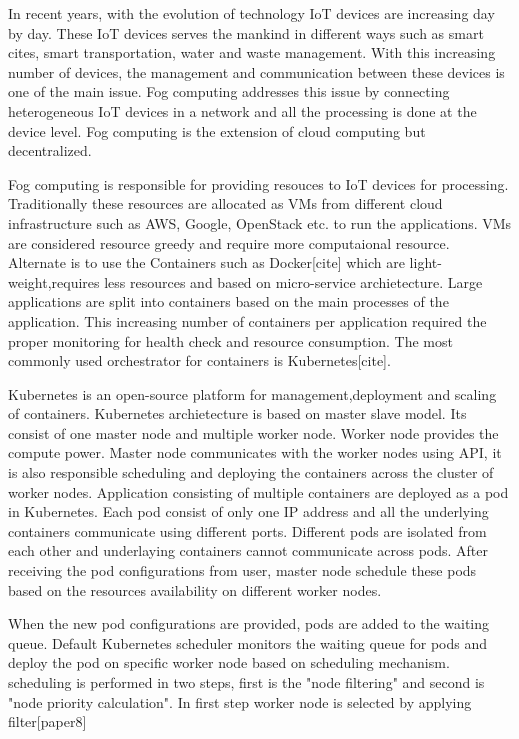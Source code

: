 \documentclass[12pt,twoside,doublepage]{article}
\begin{document}
In recent years, with the evolution of technology IoT devices are increasing day
by day. These IoT devices serves the mankind in different ways such as smart cites,
smart transportation, water and waste management. With this increasing number of devices,
the management and communication between these devices is one of the main issue. Fog computing
addresses this issue by connecting heterogeneous IoT devices in a network and all the processing
is done at the device level. Fog computing is the extension of cloud computing but decentralized.
\par
Fog computing is responsible for providing resouces to IoT devices for processing. Traditionally
these resources are allocated as VMs from different cloud infrastructure such as AWS, Google,
OpenStack etc. to run the applications. VMs are considered resource greedy
and require more computaional resource. Alternate is to use the Containers such as Docker[cite]
which are light-weight,requires less resources and based on micro-service archietecture. Large applications are split into
containers based on the main processes of the application. This increasing number of containers per application
required the proper monitoring for health check and resource consumption. The most commonly
used orchestrator for containers is Kubernetes[cite].
\par
Kubernetes is an open-source platform for management,deployment and scaling of containers.
Kubernetes archietecture is based on master slave model. Its consist of
one master node and multiple worker node. Worker node provides the compute power. Master node communicates
with the worker nodes using API, it is also responsible scheduling and deploying the containers
across the cluster of worker nodes. Application consisting of multiple containers are deployed
as a pod in Kubernetes. Each pod consist of only one IP address and all the underlying containers
communicate using different ports. Different pods are isolated from each other and underlaying
containers cannot communicate across pods. After receiving the pod configurations from user, master node
schedule these pods based on the resources availability on different worker nodes.
\par
When the new pod configurations are provided, pods are added to the waiting queue. Default Kubernetes
scheduler monitors the waiting queue for pods and deploy the pod on specific worker node based on
scheduling mechanism. scheduling is performed in two steps, first is the "node filtering" and
second is "node priority calculation". In first step worker node is selected by applying filter[paper8]
\end{document}
